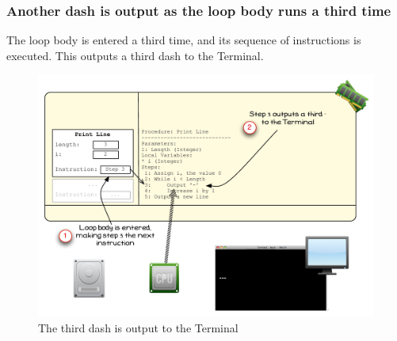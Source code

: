 \clearpage

\subsubsection{Another dash is output as the loop body runs a third time} %
\label{ssub:another_dash_is_output_as_the_loop_body_runs_a_third_time}

The loop body is entered a third time, and its sequence of instructions is executed. This outputs a third dash to the Terminal.

\begin{figure}[htbp]
   \centering
   \includegraphics[width=\textwidth]{./topics/control-flow/images/PrintLine9} 
   \caption{The third dash is output to the Terminal}
   \label{fig:print-line-9}
\end{figure}


